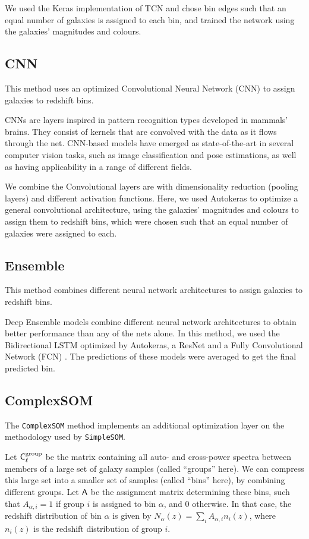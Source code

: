 \documentclass[twocolumn,twocolappendix]{aastex63}
\begin{document}
We used the Keras implementation of TCN \citep{kerastcn} and chose bin edges such that an equal
number of galaxies is assigned to each bin, and trained the network using the galaxies' magnitudes
and colours. 

\subsection{ {\sc CNN} } 
This method uses an optimized Convolutional Neural Network (CNN) to assign
galaxies to redshift bins. 
 
CNNs \citep{lecun2015deep} are layers inspired in pattern recognition types developed in mammals' brains.
They consist of kernels that are convolved with the data as it flows through the net. CNN-based
models have emerged as state-of-the-art in several computer vision tasks, such as image
classification and pose estimations, as well as having applicability in a range of different fields.
 
We combine the Convolutional layers are with dimensionality reduction (pooling layers) and different
activation functions. Here, we used Autokeras to optimize a general convolutional architecture,
using the galaxies' magnitudes and colours to assign them to redshift bins, which were chosen such
that an equal number of galaxies were assigned to each.


\subsection{ {\sc Ensemble} } 
\label{ClecioEnsemble} 
This method combines different neural network
architectures to assign galaxies to redshift bins.
 
Deep Ensemble models combine different neural network architectures to obtain better performance
than any of the nets alone. In this method, we used the Bidirectional LSTM optimized by Autokeras, a
ResNet \citep{resnet} and a Fully Convolutional Network (FCN) \citep{fcn}. The predictions of these
models were averaged to get the final predicted bin. 
 


\subsection{ {\sc ComplexSOM} }
The {\tt ComplexSOM} method implements an additional optimization layer on the
methodology used by {\tt SimpleSOM}.

Let ${\sf C}^{\rm group}_\ell$ be the matrix containing all auto- and
cross-power spectra between members of a large set of galaxy samples (called
``groups'' here). We can compress this large set into a smaller set of samples
(called ``bins'' here), by combining different groups. Let ${\sf A}$ be the
assignment matrix determining these bins, such that $A_{\alpha,i}=1$ if group
$i$ is assigned to bin $\alpha$, and 0 otherwise. In that case, the redshift
distribution of bin $\alpha$ is given by $N_\alpha(z)=\sum_i
A_{\alpha,i}n_i(z)$, where $n_i(z)$ is the redshift distribution of group $i$.
\end{document}
